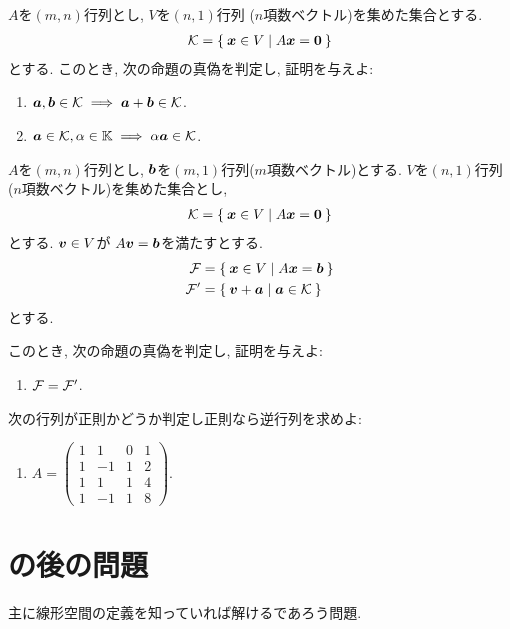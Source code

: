 \begin{quiz}
  $A$を$(m,n)$行列とし,
  $V$を$(n,1)$行列 ($n$項数ベクトル)を集めた集合とする.
  \begin{align*}
    \mathcal{K}=\Set{\boldsymbol{x}\in V | A\boldsymbol{x}=\boldsymbol{0}}
  \end{align*}
  とする.
  このとき,
  次の命題の真偽を判定し, 証明を与えよ:
  \begin{enumerate}
  \item
    $\boldsymbol{a},\boldsymbol{b}\in\mathcal{K} \implies\boldsymbol{a}+\boldsymbol{b}\in\mathcal{K}$.
  \item
    $\boldsymbol{a}\in\mathcal{K}, \alpha\in\mathbb{K} \implies \alpha\boldsymbol{a}\in\mathcal{K}$.
  \end{enumerate}
\end{quiz}

\begin{quiz}
  $A$を$(m,n)$行列とし,
  $\boldsymbol{b}$を$(m,1)$行列($m$項数ベクトル)とする.
  $V$を$(n,1)$行列 ($n$項数ベクトル)を集めた集合とし,
  \begin{align*}
    \mathcal{K}=\Set{\boldsymbol{x}\in V | A\boldsymbol{x}=\boldsymbol{0}}
  \end{align*}
  とする.
  $\boldsymbol{v}\in V$が
  $A\boldsymbol{v} =\boldsymbol{b}$を満たすとする.
  \begin{align*}
    \mathcal{F}&=\Set{\boldsymbol{x}\in V | A\boldsymbol{x}=\boldsymbol{b}}\\
    \mathcal{F}'&=\Set{\boldsymbol{v}+\boldsymbol{a}| \boldsymbol{a}\in \mathcal{K}}
  \end{align*}
  とする.
  
  このとき,
  次の命題の真偽を判定し, 証明を与えよ:
  \begin{enumerate}
  \item
    $\mathcal{F}=\mathcal{F}'$.
  \end{enumerate}
   
\end{quiz}


\begin{quiz}
  次の行列が正則かどうか判定し正則なら逆行列を求めよ:
  \begin{enumerate}
  \item
    $A=
    \begin{pmatrix}
      1&1&0&1\\
      1&-1&1&2\\
      1&1&1&4\\
      1&-1&1&8
    \end{pmatrix}$.
  \end{enumerate}
\end{quiz}


\section{の後の問題}
主に線形空間の定義を知っていれば解けるであろう問題.
